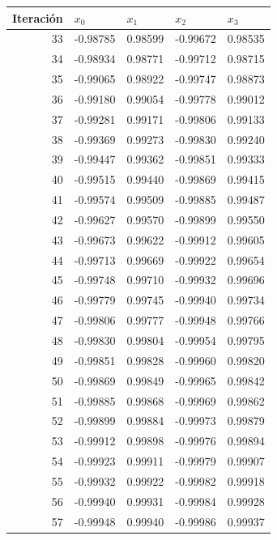 \begin{itemize}
\begin{center}
    \begin{tabular}{r|llll}
        Iteración & $x_0$ & $x_1$ & $x_2$ & $x_3$ \\
        \hline
        33 & -0.98785 & 0.98599 & -0.99672 & 0.98535 \\
        34 & -0.98934 & 0.98771 & -0.99712 & 0.98715 \\
        35 & -0.99065 & 0.98922 & -0.99747 & 0.98873 \\
        36 & -0.99180 & 0.99054 & -0.99778 & 0.99012 \\
        37 & -0.99281 & 0.99171 & -0.99806 & 0.99133 \\
        38 & -0.99369 & 0.99273 & -0.99830 & 0.99240 \\
        39 & -0.99447 & 0.99362 & -0.99851 & 0.99333 \\
        40 & -0.99515 & 0.99440 & -0.99869 & 0.99415 \\
        41 & -0.99574 & 0.99509 & -0.99885 & 0.99487 \\
        42 & -0.99627 & 0.99570 & -0.99899 & 0.99550 \\
        43 & -0.99673 & 0.99622 & -0.99912 & 0.99605 \\
        44 & -0.99713 & 0.99669 & -0.99922 & 0.99654 \\
        45 & -0.99748 & 0.99710 & -0.99932 & 0.99696 \\
        46 & -0.99779 & 0.99745 & -0.99940 & 0.99734 \\
        47 & -0.99806 & 0.99777 & -0.99948 & 0.99766 \\
        48 & -0.99830 & 0.99804 & -0.99954 & 0.99795 \\
        49 & -0.99851 & 0.99828 & -0.99960 & 0.99820 \\
        50 & -0.99869 & 0.99849 & -0.99965 & 0.99842 \\
        51 & -0.99885 & 0.99868 & -0.99969 & 0.99862 \\
        52 & -0.99899 & 0.99884 & -0.99973 & 0.99879 \\
        53 & -0.99912 & 0.99898 & -0.99976 & 0.99894 \\
        54 & -0.99923 & 0.99911 & -0.99979 & 0.99907 \\
        55 & -0.99932 & 0.99922 & -0.99982 & 0.99918 \\
        56 & -0.99940 & 0.99931 & -0.99984 & 0.99928 \\
        57 & -0.99948 & 0.99940 & -0.99986 & 0.99937 \\

\end{tabular}
\end{center}
\end{itemize}

